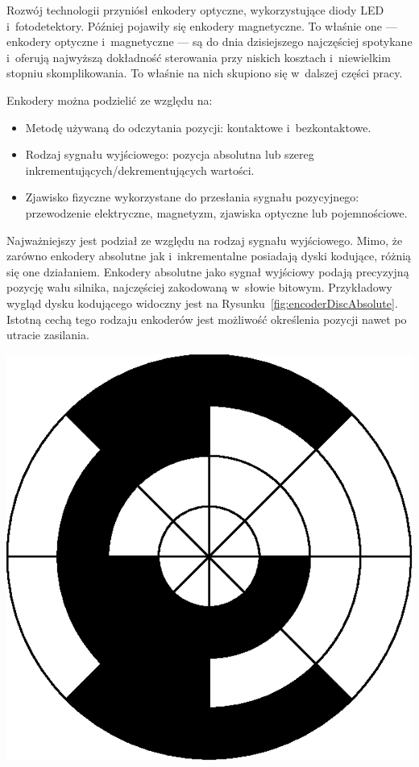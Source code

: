 Rozwój technologii przyniósł enkodery optyczne, wykorzystujące diody LED i~fotodetektory. Później pojawiły się enkodery magnetyczne. To właśnie one --- enkodery optyczne i~magnetyczne --- są do dnia dzisiejszego najczęściej spotykane i~oferują najwyższą dokładność sterowania przy niskich kosztach i~niewielkim stopniu skomplikowania. To właśnie na nich skupiono się w~dalszej części pracy.

Enkodery można podzielić ze względu na\cite{bib:rodzajeenkoderow}:
\begin{itemize}
    \item Metodę używaną do odczytania pozycji: kontaktowe i~bezkontaktowe.
    \item Rodzaj sygnału wyjściowego: pozycja absolutna lub szereg inkrementujących/dekrementujących wartości.
    \item Zjawisko fizyczne wykorzystane do przesłania sygnału pozycyjnego: przewodzenie elektryczne, magnetyzm, zjawiska optyczne lub pojemnościowe.
\end{itemize}

Najważniejszy jest podział ze względu na rodzaj sygnału wyjściowego. Mimo, że zarówno enkodery absolutne jak i~inkrementalne posiadają dyski kodujące, różnią się one działaniem. Enkodery absolutne jako sygnał wyjściowy podają precyzyjną pozycję wału silnika, najczęściej zakodowaną w~słowie bitowym. Przykładowy wygląd dysku kodującego widoczny jest na Rysunku~\ref{fig:encoderDiscAbsolute}. Istotną cechą tego rodzaju enkoderów jest możliwość określenia pozycji nawet po utracie zasilania.

\begin{center}
\includegraphics[scale=1]{images/encoderDiscAbsolute.eps}
\label{fig:encoderDiscAbsolute}
\end{center}

